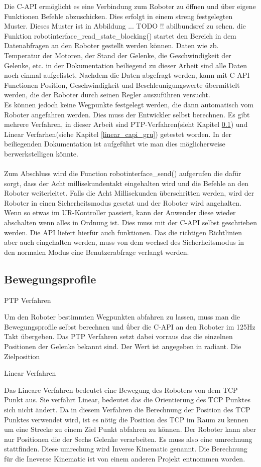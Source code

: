 Die C-API ermöglicht es eine Verbindung zum Roboter zu öffnen und über eigene Funktionen Befehle abzuschicken. Dies erfolgt in einem streng festgelegten Muster. Dieses Muster ist in Abbildung ... TODO !! abilbundsref zu sehen. 
die Funktion robotinterface\_read\_state\_blocking() startet den Bereich in dem Datenabfragen an den Roboter gestellt werden können. Daten wie zb. Temperatur der Motoren, der Stand der Gelenke, die Geschwindigkeit der Gelenke, etc. in der Dokumentation beiliegend zu dieser Arbeit sind alle Daten noch einmal aufgelistet. Nachdem die Daten abgefragt werden, kann mit C-API Functionen Position, Geschwindigkeit und Beschleunigungswerte übermittelt werden, die der Roboter durch seinen Regler auszuführen versucht.\\
Es können jedoch keine Wegpunkte festgelegt werden, die dann automatisch vom Roboter angefahren werden. Dies muss der Entwickler selbst 
berechnen. Es gibt mehrere Verfahren, in dieser Arbeit sind PTP-Verfahren(sieht Kapitel \ref{ptp_capi_gru}) und Linear Verfarhen(siehe Kapitel \ref{linear_capi_gru}) getestet worden. In der beiliegenden Dokumentation ist aufgeführt wie man dies möglicherweise berwerkstelligen könnte.
\\\\
Zum Abschluss wird die Function robotinterface\_send() aufgerufen die dafür sorgt, dass der Acht millisekundentakt eingehalten wird und die Befehle an den Roboter weiterleitet. Falls die Acht Millisekunden überschritten werden, wird der Roboter in einen Sicherheitsmodus gesetzt
und der Roboter wird angehalten.\\
Wenn so etwas im UR-Kontroller passiert, kann der Anwender diese wieder abschalten wenn alles in Ordnung ist. Dies muss mit der C-API selbst geschrieben werden. Die API liefert hierfür auch funktionen. Das die richtigen Richtlinien aber auch eingehalten werden, muss von dem wechsel des Sicherheitsmodus in den normalen Modus eine Benutzerabfrage verlangt werden.

\subsection{Bewegungsprofile}
\label{ptp_capi_gru}

PTP Verfahren 

Um den Roboter bestimmten Wegpunkten abfahren zu lassen, muss man die Bewegungsprofile selbst berechnen und ǘber die C-API an den Roboter im 125Hz Takt übergeben. Das PTP Verfahren setzt dabei vorraus das die einzelnen Positionen der Gelenke bekannt sind. Der Wert ist angegeben in radiant. Die Zielposition

Linear Verfahren

Das Lineare Verfahren bedeutet eine Bewegung des Roboters von dem TCP Punkt aus. Sie verfährt Linear, bedeutet das die Orientierung 
des TCP Punktes sich nicht ändert. Da in diesem Verfahren die Berechnung der Position des TCP Punktes verwendet wird, ist es nötig die Position des TCP im Raum zu kennen um eine Strecke zu einem Ziel Punkt abfahren zu können. Der Roboter kann aber nur Positionen die der Sechs Gelenke verarbeiten. Es muss also eine umrechnung stattfinden. Diese umrechung wird Inverse Kinematic genannt. Die Berechnung für die Ineverse Kinematic ist von einem anderen Projekt entnommen worden.